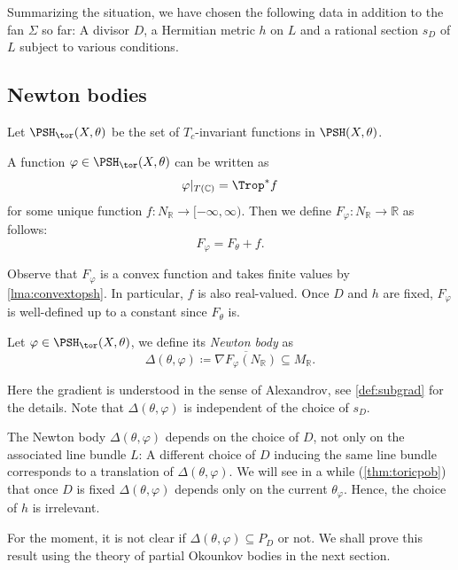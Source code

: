 Summarizing the situation, we have chosen the following data in addition to the fan $\Sigma$ so far: A divisor $D$, a Hermitian metric $h$ on $L$ and a rational section $s_D$ of $L$ subject to various conditions.

\subsection{Newton bodies}
\label{subsec:newton_big}
Let $\PSH_{\tor}(X,\theta)$ be the set of $T_c$-invariant functions in $\PSH(X,\theta)$.

\begin{definition}\label{def:toric-big:L416}
    A function $\varphi\in \PSH_{\tor}(X,\theta)$ can be written as
\[
\varphi|_{T(\mathbb{C})}=\Trop^*f
\]
for some unique function $f\colon N_{\mathbb{R}}\rightarrow [-\infty,\infty)$. Then we define $F_{\varphi}\colon N_{\mathbb{R}}\rightarrow \mathbb{R}$ as follows:
\begin{equation}\label{eq:Fvarphibig1}
F_{\varphi}=F_{\theta}+f.
\end{equation}
\end{definition}
Observe that $F_{\varphi}$ is a convex function and takes finite values by \cref{lma:convextopsh}. In particular, $f$ is also real-valued.
Once $D$ and $h$ are fixed, $F_{\varphi}$ is well-defined up to a constant since $F_{\theta}$ is.

\begin{definition}\label{def:toric-big:L430}
    Let $\varphi\in \PSH_{\tor}(X,\theta)$, we define its \emph{Newton body} as
    \[
    \Delta(\theta,\varphi)\coloneqq \overline{\nabla F_{\varphi}(N_{\mathbb{R}})}\subseteq M_{\mathbb{R}}.
    \]
    \index{$\Delta(\theta,\varphi)$}
\end{definition}
Here the gradient is understood in the sense of Alexandrov, see \cref{def:subgrad} for the details.
Note that $\Delta(\theta,\varphi)$ is independent of the choice of $s_D$.

The Newton body $\Delta(\theta,\varphi)$ depends on the choice of $D$, not only on the associated line bundle $L$: A different choice of $D$ inducing the same line bundle corresponds to a translation of $\Delta(\theta,\varphi)$. We will see in a while (\cref{thm:toricpob}) that once $D$ is fixed $\Delta(\theta,\varphi)$ depends only on the current $\theta_{\varphi}$. Hence, the choice of $h$ is irrelevant.

For the moment, it is not clear if $\Delta(\theta,\varphi)\subseteq P_D$ or not. We shall prove this result using the theory of partial Okounkov bodies in the next section.

